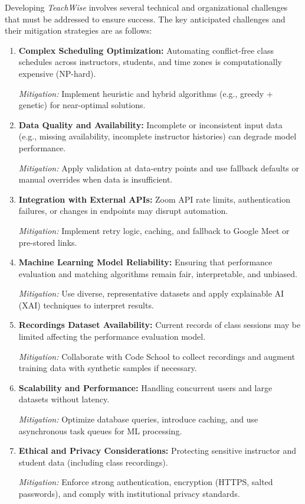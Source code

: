 Developing \textit{TeachWise} involves several technical and organizational challenges that must be addressed to ensure success. The key anticipated challenges and their mitigation strategies are as follows:

\begin{enumerate}
    \item \textbf{Complex Scheduling Optimization:}  
    Automating conflict-free class schedules across instructors, students, and time zones is computationally expensive (NP-hard).  

    \textit{Mitigation:} Implement heuristic and hybrid algorithms (e.g., greedy + genetic) for near-optimal solutions.

    \item \textbf{Data Quality and Availability:}  
    Incomplete or inconsistent input data (e.g., missing availability, incomplete instructor histories) can degrade model performance.  

    \textit{Mitigation:} Apply validation at data-entry points and use fallback defaults or manual overrides when data is insufficient.

    \item \textbf{Integration with External APIs:}  
    Zoom API rate limits, authentication failures, or changes in endpoints may disrupt automation.  

    \textit{Mitigation:} Implement retry logic, caching, and fallback to Google Meet or pre-stored links.

    \item \textbf{Machine Learning Model Reliability:}  
    Ensuring that performance evaluation and matching algorithms remain fair, interpretable, and unbiased.  

    \textit{Mitigation:} Use diverse, representative datasets and apply explainable AI (XAI) techniques to interpret results.

    \item \textbf{Recordings Dataset Availability:}  
    Current records of class sessions may be limited affecting the performance evaluation model.  

    \textit{Mitigation:} Collaborate with Code School to collect recordings and augment training data with synthetic samples if necessary.

    \item \textbf{Scalability and Performance:}  
    Handling concurrent users and large datasets without latency.  

    \textit{Mitigation:} Optimize database queries, introduce caching, and use asynchronous task queues for ML processing.

    \item \textbf{Ethical and Privacy Considerations:}  
    Protecting sensitive instructor and student data (including class recordings).  

    \textit{Mitigation:} Enforce strong authentication, encryption (HTTPS, salted passwords), and comply with institutional privacy standards.
\end{enumerate}

